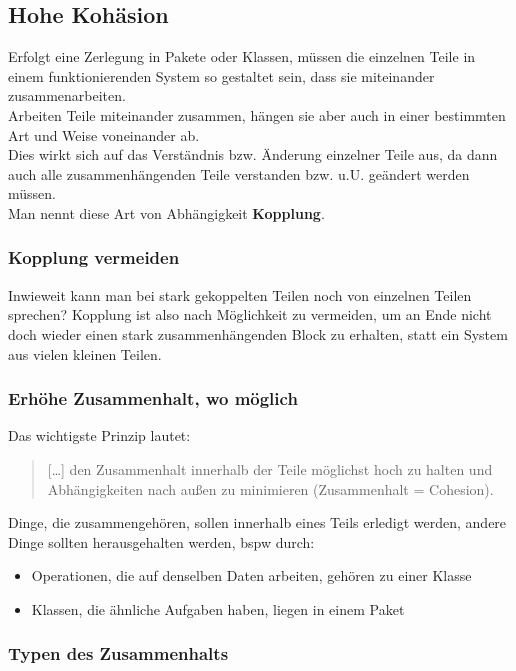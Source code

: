 \subsection{Hohe Kohäsion}\label{subsec:hohe-kohasion}
Erfolgt eine Zerlegung in Pakete oder Klassen, müssen die einzelnen Teile in einem funktionierenden System so gestaltet sein, dass sie miteinander zusammenarbeiten.\\
Arbeiten Teile miteinander zusammen, hängen sie aber auch in einer bestimmten Art und Weise voneinander ab.\\
Dies wirkt sich auf das Verständnis bzw. Änderung einzelner Teile aus, da dann auch alle zusammenhängenden Teile verstanden bzw. u.U. geändert werden müssen.\\

\noindent
Man nennt diese Art von Abhängigkeit \textbf{Kopplung}.

\subsubsection*{Kopplung vermeiden}
Inwieweit kann man bei stark gekoppelten Teilen noch von einzelnen Teilen sprechen? Kopplung ist also nach Möglichkeit zu vermeiden, um an Ende nicht doch wieder einen stark zusammenhängenden Block zu erhalten, statt ein System aus vielen kleinen Teilen.

\subsubsection*{Erhöhe Zusammenhalt, wo möglich}
Das wichtigste Prinzip lautet:

\blockquote[{\cite[71]{Wed09b}}]{
[\ldots] den Zusammenhalt innerhalb der Teile möglichst hoch zu halten und Abhängigkeiten nach außen zu minimieren (Zusammenhalt = Cohesion).
}
\noindent
Dinge, die zusammengehören, sollen innerhalb eines Teils erledigt werden, andere Dinge sollten herausgehalten werden, bspw durch:

\begin{itemize}
    \item Operationen, die auf denselben Daten arbeiten, gehören zu einer Klasse
    \item Klassen, die ähnliche Aufgaben haben, liegen in einem Paket
\end{itemize}

\subsubsection*{Typen des Zusammenhalts}

